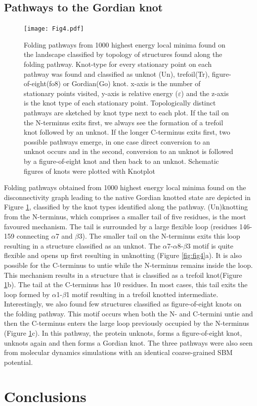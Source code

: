 \documentclass[journal=jacsat]{achemso}
\begin{document}
\subsection{Pathways to the	Gordian knot}
\begin{figure}
    \centering
    \texttt{[image: Fig4.pdf]}
    \caption{Folding pathways from 1000 highest energy local minima found on the landscape classified by topology of structures found along the folding pathway. Knot-type for every stationary point on each pathway was found and classified as unknot (Un), trefoil(Tr), figure-of-eight(fo8) or Gordian(Go) knot. x-axis is the number of stationary points visited, y-axis is relative energy ($\varepsilon$) and the z-axis is the knot type of each stationary point. Topologically distinct pathways are sketched by knot type next to each plot. If the tail on the N-terminus exits first, we always see the formation of a trefoil knot followed by an unknot. If the longer C-terminus exits first, two possible pathways emerge, in one case direct conversion to an unknot occurs and in the second, conversion to an unknot is followed by a figure-of-eight knot and then back to an unknot. Schematic figures of knots were plotted with Knotplot\cite{knotplot}}
    \label{fig:fig3}
\end{figure}
Folding pathways obtained from 1000 highest energy local minima found on the disconnectivity graph leading to the native Gordian knotted state are depicted in Figure \ref{fig:fig3}, classified by the knot types identified along the pathway. (Un)knotting from the N-terminus, which comprises a smaller tail of five residues, is the most favoured mechanism. The tail is surrounded by a large flexible loop (residues 146-159 connecting $\alpha$7 and $\beta$3). The smaller tail on the N-terminus exits this loop resulting in a structure classified as an unknot. The $\alpha$7-$\alpha$8-$\beta$3 motif is quite flexible and opens up first resulting in unknotting (Figure \ref{fig:fig4}a). It is also possible for the C-terminus to untie while the N-terminus remains inside the loop. This mechanism results in a structure that is classified as a trefoil knot(Figure \ref{fig:fig3}b). The tail at the C-terminus has 10 residues. In most cases, this tail exits the loop formed by $\alpha$1-$\beta$1 motif resulting in a trefoil knotted intermediate. Interestingly, we also found few structures classified as figure-of-eight knots on the folding pathway. This motif occurs when both the N- and C-termini untie and then the C-terminus enters the large loop previously occupied by the N-terminus (Figure \ref{fig:fig3}c). In this pathway, the protein unknots, forms a figure-of-eight knot, unknots again and then forms a Gordian knot. The three pathways were also seen from molecular dynamics simulations with an identical coarse-grained SBM potential\cite{Zhao18a}. 





\section{Conclusions}



%

\end{document}
